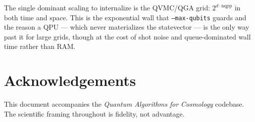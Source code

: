 \documentclass[11pt]{article}
\newcommand{\code}[1]{\texttt{#1}}
\begin{document}
The single dominant scaling to internalize is the QVMC/QGA grid:
$2^{d\cdot\mathrm{nqpp}}$ in both time and space. This is the exponential wall
that \code{--max-qubits} guards and the reason a QPU --- which never
materializes the statevector --- is the only way past it for large grids,
though at the cost of shot noise and queue-dominated wall time rather than RAM.

\section*{Acknowledgements}
This document accompanies the \emph{Quantum Algorithms for Cosmology}
codebase. The scientific framing throughout is fidelity, not advantage.
\end{document}
